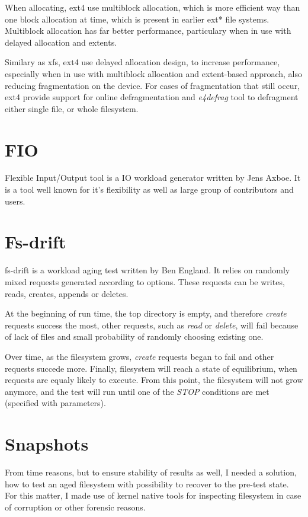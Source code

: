 \documentclass[
  color, %
  table, %
  lof,   %
  lot,   %
]{fithesis3}
\begin{document}
When allocating, ext4 use multiblock allocation, which is more efficient way than one block allocation at time, which is present in earlier ext* file systems. Multiblock allocation has far better performance, particulary when in use with delayed allocation and extents.

Similary as xfs, ext4 use delayed allocation design, to increase performance, especially when in use with multiblock allocation and extent-based approach, also reducing fragmentation on the device. For cases of fragmentation that still occur, ext4 provide support for online defragmentation and \textit{e4defrag} tool to defragment either single file, or whole filesystem.

\section{FIO}
Flexible Input/Output tool is a IO workload generator written by Jens Axboe. It is a tool well known for it's flexibility as well as large group of contributors and users.


\section{Fs-drift}
fs-drift is a workload aging test written by Ben England. It relies on randomly mixed requests generated according to options. These requests can be writes, reads, creates, appends or deletes.

At the beginning of run time, the top directory is empty, and therefore \textit{create} requests success the most, other requests, such as \textit{read} or \textit{delete}, will fail because of lack of files and small probability of randomly choosing existing one. 

Over time, as the filesystem grows, \textit{create} requests began to fail and other requests succede more. Finally, filesystem will reach a state of equilibrium, when requests are equaly likely to execute. From this point, the filesystem will not grow anymore, and the test will run until one of the \textit{STOP} conditions are met (specified with parameters).

\section{Snapshots}
From time reasons, but to ensure stability of results as well, I needed a solution, how to test an aged filesystem with possibility to recover to the pre-test state. For this matter, I made use of kernel native tools for inspecting filesystem in case of corruption or other forensic reasons.
\end{document}
